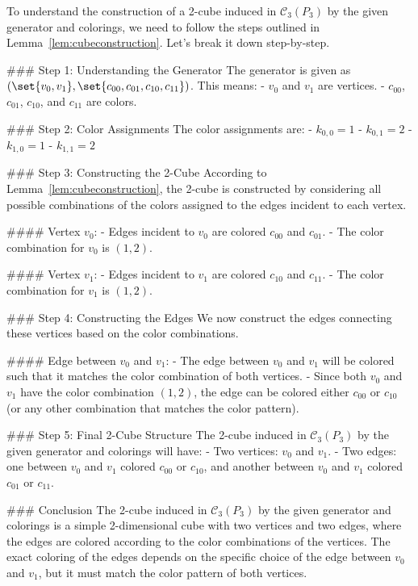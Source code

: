 To understand the construction of a 2-cube induced in \(\mathcal{C}_3(P_3)\) by the given generator and colorings, we need to follow the steps outlined in Lemma~\ref{lem:cubeconstruction}. Let's break it down step-by-step.

### Step 1: Understanding the Generator
The generator is given as \((\set{v_0, v_1}, \set{c_{00}, c_{01}, c_{10}, c_{11}})\). This means:
- \(v_0\) and \(v_1\) are vertices.
- \(c_{00}\), \(c_{01}\), \(c_{10}\), and \(c_{11}\) are colors.

### Step 2: Color Assignments
The color assignments are:
- \(k_{0,0} = 1\)
- \(k_{0,1} = 2\)
- \(k_{1,0} = 1\)
- \(k_{1,1} = 2\)

### Step 3: Constructing the 2-Cube
According to Lemma~\ref{lem:cubeconstruction}, the 2-cube is constructed by considering all possible combinations of the colors assigned to the edges incident to each vertex.

#### Vertex \(v_0\):
- Edges incident to \(v_0\) are colored \(c_{00}\) and \(c_{01}\).
- The color combination for \(v_0\) is \((1, 2)\).

#### Vertex \(v_1\):
- Edges incident to \(v_1\) are colored \(c_{10}\) and \(c_{11}\).
- The color combination for \(v_1\) is \((1, 2)\).

### Step 4: Constructing the Edges
We now construct the edges connecting these vertices based on the color combinations.

#### Edge between \(v_0\) and \(v_1\):
- The edge between \(v_0\) and \(v_1\) will be colored such that it matches the color combination of both vertices.
- Since both \(v_0\) and \(v_1\) have the color combination \((1, 2)\), the edge can be colored either \(c_{00}\) or \(c_{10}\) (or any other combination that matches the color pattern).

### Step 5: Final 2-Cube Structure
The 2-cube induced in \(\mathcal{C}_3(P_3)\) by the given generator and colorings will have:
- Two vertices: \(v_0\) and \(v_1\).
- Two edges: one between \(v_0\) and \(v_1\) colored \(c_{00}\) or \(c_{10}\), and another between \(v_0\) and \(v_1\) colored \(c_{01}\) or \(c_{11}\).

### Conclusion
The 2-cube induced in \(\mathcal{C}_3(P_3)\) by the given generator and colorings is a simple 2-dimensional cube with two vertices and two edges, where the edges are colored according to the color combinations of the vertices. The exact coloring of the edges depends on the specific choice of the edge between \(v_0\) and \(v_1\), but it must match the color pattern of both vertices.